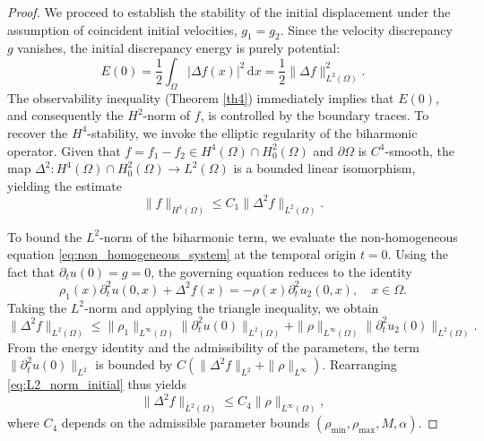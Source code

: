 \documentclass[12pt,reqno]{amsart}
\numberwithin{equation}{section}
\begin{document}
	\begin{proof}
		We proceed to establish the stability of the initial displacement under the assumption of coincident initial velocities, $g_1 = g_2$. Since the velocity discrepancy $g$ vanishes, the initial discrepancy energy is purely potential:
		\[
		E(0) = \frac{1}{2} \int_{\Omega} |\Delta f(x)|^2 \, \mathrm{d}x = \frac{1}{2} \|\Delta f\|_{L^2(\Omega)}^2.
		\]
		The observability inequality (Theorem \ref{th4}) immediately implies that $E(0)$, and consequently the $H^2$-norm of $f$, is controlled by the boundary traces. To recover the $H^4$-stability, we invoke the elliptic regularity of the biharmonic operator. Given that $f = f_1 - f_2 \in H^4(\Omega) \cap H_0^2(\Omega)$ and $\partial\Omega$ is $C^4$-smooth, the map $\Delta^2 : H^4(\Omega) \cap H_0^2(\Omega) \to L^2(\Omega)$ is a bounded linear isomorphism, yielding the estimate
		\begin{equation}\label{eq:elliptic_regularity}
			\|f\|_{H^4(\Omega)} \leq C_1 \|\Delta^2 f\|_{L^2(\Omega)}.
		\end{equation}
		
		To bound the $L^2$-norm of the biharmonic term, we evaluate the non-homogeneous equation \eqref{eq:non_homogeneous_system} at the temporal origin $t = 0$. Using the fact that $\partial_t u(0) = g = 0$, the governing equation reduces to the identity
		\begin{equation*}\label{eq:PDE_initial}
			\rho_1(x) \partial_t^2 u(0, x) + \Delta^2 f(x) = -\rho(x) \partial_t^2 u_2(0, x), \quad x \in \Omega.
		\end{equation*}
		Taking the $L^2$-norm and applying the triangle inequality, we obtain
		\begin{equation}\label{eq:L2_norm_initial}
			\|\Delta^2 f\|_{L^2(\Omega)} \leq \|\rho_1\|_{L^\infty(\Omega)} \|\partial_t^2 u(0)\|_{L^2(\Omega)} + \|\rho\|_{L^\infty(\Omega)} \|\partial_t^2 u_2(0)\|_{L^2(\Omega)}.
		\end{equation}
		From the energy identity and the admissibility of the parameters, the term $\|\partial_t^2 u(0)\|_{L^2}$ is bounded by $C(\|\Delta^2 f\|_{L^2} + \|\rho\|_{L^\infty})$. Rearranging \eqref{eq:L2_norm_initial} thus yields
		\begin{equation}\label{eq:Delta2f_estimate}
			\|\Delta^2 f\|_{L^2(\Omega)} \leq C_4 \|\rho\|_{L^\infty(\Omega)},
		\end{equation}
		where $C_4$ depends on the admissible parameter bounds $(\rho_{\min}, \rho_{\max}, M, \alpha)$.
		

\end{proof}
\end{document}

